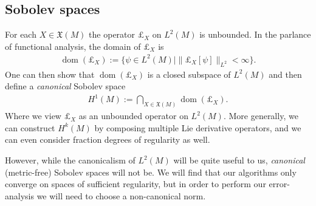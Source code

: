 \documentclass[12pt]{amsart}
\begin{document}
\subsection{Sobolev spaces}
\label{sec:Sobolev spaces}
For each $X \in \mathfrak{X}(M)$ the operator $\pounds_{X}$ on $L^{2}(M)$ is unbounded.
In the parlance of functional analysis, the domain of $\pounds_{X}$ is
\begin{align}
	\operatorname{dom}( \pounds_{X} ) := \{ \psi \in L^{2}(M) \mid  \| \pounds_{X}[\psi] \|_{L^{2}} < \infty \}.
\end{align}
One can then show that $\operatorname{dom}( \pounds_{X} )$ is a closed subspace of $L^{2}(M)$ and then define
a \emph{canonical} Sobolev space
\begin{align}
	H^{1}(M) := \bigcap_{X \in \mathfrak{X}(M)} \operatorname{dom}( \pounds_{X} ).
\end{align}
Where we view $\pounds_{X}$ as an unbounded operator on $L^{2}(M)$.
More generally, we can construct $H^{k}(M)$ by composing multiple Lie derivative operators,
and we can even consider fraction degrees of regularity as well.

  However, while the canonicalism of $L^{2}(M)$ will be quite useful to us,
  \emph{canonical} (metric-free) Sobolev spaces will not be.
  We will find that our algorithms only converge on spaces of sufficient regularity,
  but in order to perform our error-analysis we will need to choose a non-canonical norm.
  
\end{document}
